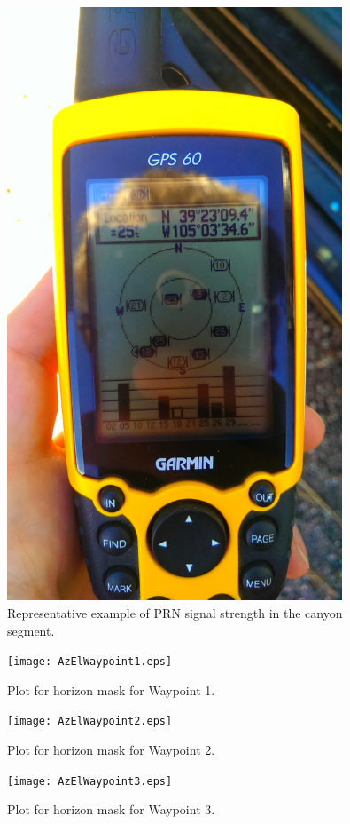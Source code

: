 \documentclass[]{aiaa-tc}%
\begin{document}
	\begin{figure}[H]
		\centering
		\includegraphics[width = 10cm]{BadSignalStrength.jpg}
		\caption{Representative example of PRN signal strength in the canyon segment. }
		\label{fig:BadSignalStrength}
	\end{figure}
	
	\begin{figure}[H]
		\centering
		\texttt{[image: AzElWaypoint1.eps]}
		\caption{Plot for horizon mask for Waypoint 1.}
		\label{fig:AzElWaypoint1}
	\end{figure}
	
	\begin{figure}[H]
		\centering
		\texttt{[image: AzElWaypoint2.eps]}
		\caption{Plot for horizon mask for Waypoint 2.}
		\label{fig:AzElWaypoint2}
	\end{figure}
	
	\begin{figure}[H]
		\centering
		\texttt{[image: AzElWaypoint3.eps]}
		\caption{Plot for horizon mask for Waypoint 3.}
		\label{fig:AzElWaypoint3}
	\end{figure}
	
\end{document}
